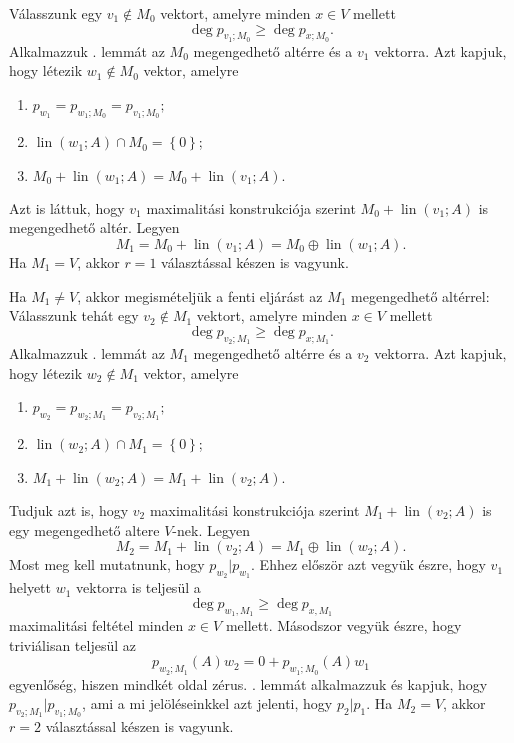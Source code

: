 \documentclass[a4paper, showtrims]{memoir}
\makeatletter
\renewenvironment{proof}[1][\proofname]
    {\par\pushQED{\qed}%
    \normalfont \topsep6\p@\@plus6\p@\relax
    \trivlist
    \item[\hskip\labelsep
        \itshape
    #1\@addpunct{:}]\ignorespaces}
    {\popQED\endtrivlist\@endpefalse}
\theoremstyle{plain}
\theoremstyle{remark}
\theoremstyle{definition}
\DeclareMathOperator{\lin}{lin}
\makeatother
\begin{document}
\begin{proof}
    Válasszunk egy $v_1\notin M_0$ vektort, amelyre minden $x\in V$ mellett
    \[
        \deg p_{v_1;M_0}\geq \deg p_{x;M_0}.
    \]
    Alkalmazzuk . lemmát az $M_0$ megengedhető altérre és a $v_1$ vektorra.
    Azt kapjuk, hogy létezik $w_1\notin M_0$ vektor, amelyre
    \begin{enumerate}
        \item
            \(
            p_{w_1}
            =
            p_{w_1;M_0}
            =
            p_{v_1;M_0};
            \)
        \item 
            $\lin\left( w_1;A \right)\cap M_0=\left\{ 0 \right\}$;
        \item
            \(
            M_0+\lin\left( w_1;A \right)
            =
            M_0+\lin\left( v_1;A \right).
            \)
    \end{enumerate}
    Azt is láttuk, hogy $v_1$ maximalitási konstrukciója szerint $M_0+\lin\left( v_1;A \right)$ is megengedhető altér.
    Legyen $$M_1=M_0+\lin\left( v_1;A \right)=M_0\oplus\lin\left( w_1;A \right).$$
    Ha $M_1=V$, akkor $r=1$ választással készen is vagyunk.

    Ha $M_1\neq V$, akkor megismételjük a fenti eljárást az $M_1$ megengedhető altérrel:
    Válasszunk tehát egy $v_2\notin M_1$ vektort, amelyre minden $x\in V$ mellett
    \[
        \deg p_{v_2;M_1}\geq \deg p_{x;M_1}.
    \]
    Alkalmazzuk . lemmát az $M_1$ megengedhető altérre és a $v_2$ vektorra.
    Azt kapjuk, hogy létezik $w_2\notin M_1$ vektor, amelyre
    \begin{enumerate}
        \item
            \(
            p_{w_2}
            =
            p_{w_2;M_1}
            =
            p_{v_2;M_1};
            \)
        \item 
            $\lin\left( w_2;A \right)\cap M_1=\left\{ 0 \right\}$;
        \item
            \(
            M_1+\lin\left( w_2;A \right)
            =
            M_1+\lin\left( v_2;A \right).
            \)
    \end{enumerate}
    Tudjuk azt is, hogy $v_2$ maximalitási konstrukciója szerint $M_1+\lin\left( v_2;A \right)$ is egy megengedhető altere $V$-nek.
    Legyen $$M_2=M_1+\lin\left( v_2;A \right)=M_1\oplus\lin\left( w_2;A \right).$$
    Most meg kell mutatnunk, hogy $p_{w_2}|p_{w_1}$. 
    Ehhez először azt vegyük észre, hogy $v_1$ helyett $w_1$ vektorra is teljesül a
    \[
        \deg p_{w_1,M_1}
        \geq
        \deg p_{x,M_1}
    \]
    maximalitási feltétel minden $x\in V$ mellett.
    Másodszor vegyük észre, hogy triviálisan teljesül az
    \[
        p_{w_2;M_1}\left( A \right)w_2=0+p_{w_1;M_0}\left( A \right)w_1
    \]
    egyenlőség, hiszen mindkét oldal zérus.
    . lemmát alkalmazzuk és kapjuk, hogy
    $p_{v_2;M_1}|p_{v_1;M_0}$, ami a mi jelöléseinkkel azt jelenti, hogy $p_2|p_1$.
    Ha $M_2=V$, akkor $r=2$ választással készen is vagyunk.


\end{proof}
\end{document}
